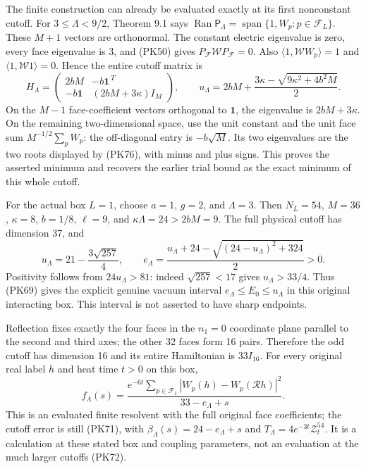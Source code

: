 \documentclass[11pt]{article}
\begin{document}
The finite construction can already be evaluated exactly at its first
nonconstant cutoff. For \(3\le\Lambda<9/2\), Theorem 9.1 says
\(\operatorname{Ran}\mathsf P_\Lambda
=\operatorname{span}\{1,W_p:p\in\mathcal F_L\}\).
These \(M+1\) vectors are orthonormal. The constant electric eigenvalue
is zero, every face eigenvalue is \(3\), and (PK50) gives
\(P_{\mathcal F}\mathcal WP_{\mathcal F}=0\).
Also \(\langle1,\mathcal WW_p\rangle=1\) and
\(\langle1,\mathcal W1\rangle=0\). Hence the entire cutoff matrix is
\[
 H_\Lambda=
 \begin{pmatrix}
  2bM&-b\mathbf1^{\,T}\\
  -b\mathbf1&(2bM+3\kappa)I_M
 \end{pmatrix},\qquad
 u_\Lambda=2bM+
      \frac{3\kappa-\sqrt{9\kappa^2+4b^2M}}2 .
 \tag{PK76}
\]
On the \(M-1\) face-coefficient vectors orthogonal to \(\mathbf1\),
the eigenvalue is \(2bM+3\kappa\). On the remaining two-dimensional
space, use the unit constant and the unit face sum
\(M^{-1/2}\sum_pW_p\): the off-diagonal entry is \(-b\sqrt M\).
Its two eigenvalues are the two roots displayed by (PK76), with minus
and plus signs. This proves the asserted minimum and recovers the earlier
trial bound as the exact minimum of this whole cutoff.

For the actual box \(L=1\), choose \(a=1\), \(g=2\), and \(\Lambda=3\).
Then \(N_L=54\), \(M=36\), \(\kappa=8\), \(b=1/8\), \(\ell=9\),
and \(\kappa\Lambda=24>2bM=9\). The full physical cutoff has dimension
37, and
\[
 u_\Lambda=21-\frac{3\sqrt{257}}4,\qquad
 e_\Lambda=
 \frac{u_\Lambda+24-\sqrt{(24-u_\Lambda)^2+324}}2>0 .
 \tag{PK77}
\]
Positivity follows from \(24u_\Lambda>81\): indeed \(\sqrt{257}<17\)
gives \(u_\Lambda>33/4\). Thus (PK69) gives the explicit genuine vacuum
interval \(e_\Lambda\le E_0\le u_\Lambda\) in this original interacting
box. This interval is not asserted to have sharp endpoints.

Reflection fixes exactly the four faces in the \(n_1=0\) coordinate
plane parallel to the second and third axes; the other 32 faces form
16 pairs. Therefore the odd cutoff has dimension 16 and its entire
Hamiltonian is \(33I_{16}\). For every original real label \(h\) and
heat time \(t>0\) on this box,
\[
 f_\Lambda(s)=
 \frac{e^{-6t}\sum_{p\in\mathcal F_1}
       |W_p(h)-W_p(\mathcal Rh)|^2}{33-e_\Lambda+s}.
 \tag{PK78}
\]
This is an evaluated finite resolvent with the full original face
coefficients; the cutoff error is still (PK71), with
\(\beta_\Lambda(s)=24-e_\Lambda+s\) and
\(T_\Lambda=4e^{-3t}\mathcal Z_t^{54}\).
It is a calculation at these stated box and coupling parameters,
not an evaluation at the much larger cutoffs (PK72).
\end{document}
